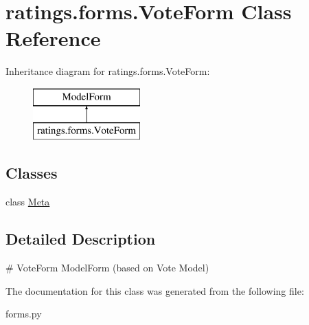 \hypertarget{classratings_1_1forms_1_1VoteForm}{\section{ratings.\-forms.\-Vote\-Form Class Reference}
\label{classratings_1_1forms_1_1VoteForm}
}
Inheritance diagram for ratings.\-forms.\-Vote\-Form\-:\begin{figure}[H]
\begin{center}
\leavevmode
\includegraphics[height=2.000000cm]{classratings_1_1forms_1_1VoteForm}
\end{center}
\end{figure}
\subsection*{Classes}
\begin{DoxyCompactItemize}
\item 
class \hyperlink{classratings_1_1forms_1_1VoteForm_1_1Meta}{Meta}
\end{DoxyCompactItemize}


\subsection{Detailed Description}
\begin{DoxyVerb}# VoteForm ModelForm (based on Vote Model)
\end{DoxyVerb}
 

The documentation for this class was generated from the following file\-:\begin{DoxyCompactItemize}
\item 
forms.\-py\end{DoxyCompactItemize}
